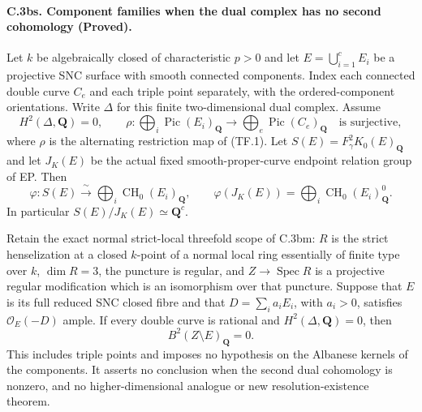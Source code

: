 \paragraph{C.3bs. Component families when the dual complex has no second
cohomology (Proved).}
Let $k$ be algebraically closed of characteristic $p>0$ and let
$E=\bigcup_{i=1}^cE_i$ be a projective SNC surface with smooth connected
components. Index each connected double curve $C_e$ and each triple
point separately, with the ordered-component orientations. Write
$\Delta$ for this finite two-dimensional dual complex. Assume
\begin{equation}
 H^2(\Delta,\mathbf Q)=0,\qquad
 \rho:\bigoplus_i\operatorname{Pic}(E_i)_{\mathbf Q}
       \longrightarrow\bigoplus_e\operatorname{Pic}(C_e)_{\mathbf Q}
       \quad\text{is surjective},                         \tag{DC.1}
\end{equation}
where $\rho$ is the alternating restriction map of (TF.1).
Let $S(E)=F_\gamma^2K_0(E)_{\mathbf Q}$ and let $J_K(E)$ be the
actual fixed smooth-proper-curve endpoint relation group of EP.
Then
\begin{equation}
 \varphi:S(E)\xrightarrow{\ \sim\ }
           \bigoplus_i\operatorname{CH}_0(E_i)_{\mathbf Q},
 \qquad
 \varphi(J_K(E))=
           \bigoplus_i\operatorname{CH}_0(E_i)^0_{\mathbf Q}.
                                                               \tag{DC.2}
\end{equation}
In particular $S(E)/J_K(E)\simeq\mathbf Q^c$.

Retain the exact normal strict-local threefold scope of C.3bm:
$R$ is the strict henselization at a closed $k$-point of a normal
local ring essentially of finite type over $k$, $\dim R=3$, the
puncture is regular, and $Z\to\operatorname{Spec}R$ is a projective
regular modification which is an isomorphism over that puncture.
Suppose that $E$ is its full reduced SNC closed fibre and that
$D=\sum_i a_iE_i$, with $a_i>0$, satisfies $\mathcal O_E(-D)$ ample.
If every double curve is rational and $H^2(\Delta,\mathbf Q)=0$, then
\begin{equation}
                        B^2(Z\setminus E)_{\mathbf Q}=0. \tag{DC.3}
\end{equation}
This includes triple points and imposes no hypothesis on the
Albanese kernels of the components. It asserts no conclusion when
the second dual cohomology is nonzero, and no higher-dimensional
analogue or new resolution-existence theorem.


